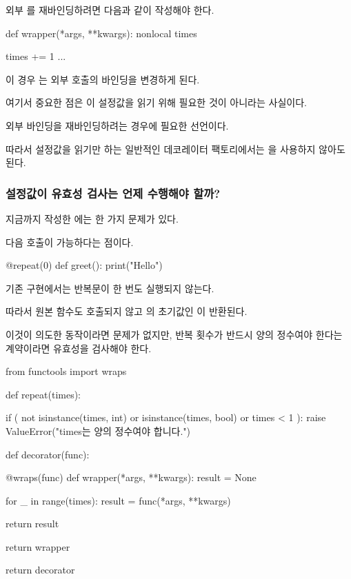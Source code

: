 외부 를 재바인딩하려면 다음과 같이 작성해야 한다.

\begin{dhkcode}
def wrapper(*args, **kwargs):
    nonlocal times

    times += 1
    ...
\end{dhkcode}

이 경우 는 외부  호출의 바인딩을 변경하게 된다.

여기서 중요한 점은 이 설정값을 읽기 위해 필요한 것이 아니라는 사실이다.

외부 바인딩을 재바인딩하려는 경우에 필요한 선언이다.

따라서 설정값을 읽기만 하는 일반적인 데코레이터 팩토리에서는 을 사용하지 않아도 된다.

\subsubsection{설정값이 유효성 검사는 언제 수행해야 할까?}

지금까지 작성한 에는 한 가지 문제가 있다.

다음 호출이 가능하다는 점이다.

\begin{dhkcode}
@repeat(0)
def greet():
    print("Hello")
\end{dhkcode}

기존 구현에서는 반복문이 한 번도 실행되지 않는다.

따라서 원본 함수도 호출되지 않고 의 초기값인 이 반환된다.

이것이 의도한 동작이라면 문제가 없지만, 반복 횟수가 반드시 양의 정수여야 한다는 계약이라면 유효성을 검사해야 한다.

\begin{dhkcode}
from functools import wraps


def repeat(times):

    if (
        not isinstance(times, int)
        or isinstance(times, bool)
        or times < 1
    ):
        raise ValueError("times는 양의 정수여야 합니다.")

    def decorator(func):

        @wraps(func)
        def wrapper(*args, **kwargs):
            result = None

            for _ in range(times):
                result = func(*args, **kwargs)

            return result

        return wrapper

    return decorator
\end{dhkcode}

